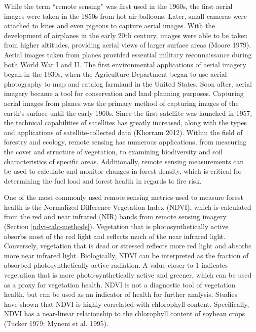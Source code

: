 \documentclass[12pt,twoside]{reedthesis}
\begin{document}
While the term ``remote sensing'' was first used in the 1960s, the first
aerial images were taken in the 1850s from hot air balloons. Later,
small cameras were attached to kites and even pigeons to capture aerial
images. With the development of airplanes in the early 20th century,
images were able to be taken from higher altitudes, providing aerial
views of larger surface areas (Moore 1979). Aerial images taken from
planes provided essential military reconnaissance during both World War
I and II. The first environmental applications of aerial imagery began
in the 1930s, when the Agriculture Department began to use aerial
photography to map and catalog farmland in the United States. Soon
after, aerial imagery became a tool for conservation and land planning
purposes. Capturing aerial images from planes was the primary method of
capturing images of the earth's surface until the early 1960s. Since the
first satellite was launched in 1957, the technical capabilities of
satellites has greatly increased, along with the types and applications
of satellite-collected data (Khorram 2012). Within the field of forestry
and ecology, remote sensing has numerous applications, from measuring
the cover and structure of vegetation, to examining biodiversity and
soil characteristics of specific areas. Additionally, remote sensing
measurements can be used to calculate and monitor changes in forest
density, which is critical for determining the fuel load and forest
health in regards to fire risk.

One of the most commonly used remote sensing metrics used to measure
forest health is the Normalized Difference Vegetation Index (NDVI),
which is calculated from the red and near infrared (NIR) bands from
remote sensing imagery (Section \ref{ndvi-calc-methods}). Vegetation
that is photosynthetically active absorbs most of the red light and
reflects much of the near infrared light. Conversely, vegetation that is
dead or stressed reflects more red light and absorbs more near infrared
light. Biologically, NDVI can be interpreted as the fraction of absorbed
photosynthetically active radiation. A value closer to 1 indicates
vegetation that is more photo-synthetically active and greener, which
can be used as a proxy for vegetation health. NDVI is not a diagnostic
tool of vegetation health, but can be used as an indicator of health for
further analysis. Studies have shown that NDVI is highly correlated with
chlorophyll content. Specifically, NDVI has a near-linear relationship
to the chlorophyll content of soybean crops (Tucker 1979; Myneni et al. 1995).
\end{document}
